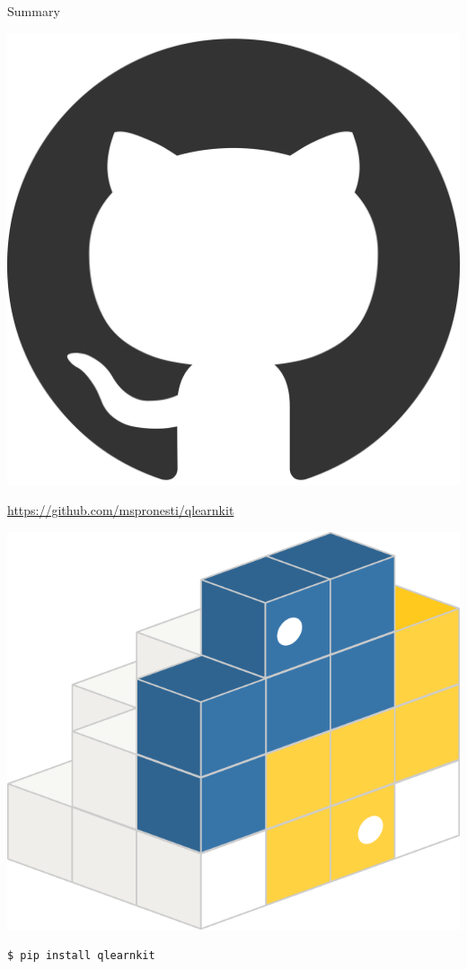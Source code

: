 	\begin{frame}{Summary}
    	\begin{minipage}[c]{0.2\textwidth}
    	\centering
			\includegraphics[width=0.5\linewidth]{gh_logo}
		\end{minipage}
		\begin{minipage}[c]{0.7\textwidth}
    		\url{https://github.com/mspronesti/qlearnkit}
		\end{minipage}
    	
    	
    	 \vspace{\abovedisplayskip}
    	\begin{minipage}[c]{0.2\textwidth}
    	\centering
			\includegraphics[width=0.5\linewidth]{pypilogo}
		\end{minipage}
		\begin{minipage}[c]{0.7\textwidth}
                \texttt{\$ pip install qlearnkit}
		\end{minipage}
		
    	\begin{center}\ccbysa\end{center}
    \end{frame}